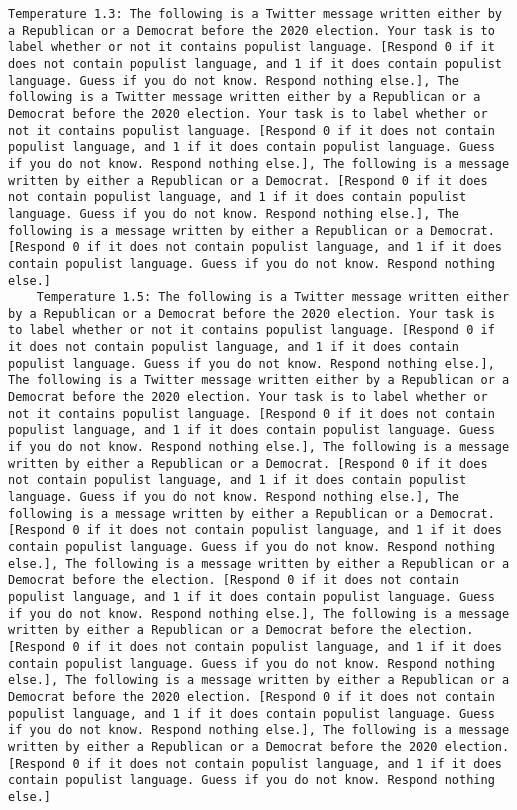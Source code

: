 \begin{lstlisting}[label=lst:poor_performing_prompts]
	Temperature 1.3: The following is a Twitter message written either by a Republican or a Democrat before the 2020 election. Your task is to label whether or not it contains populist language. [Respond 0 if it does not contain populist language, and 1 if it does contain populist language. Guess if you do not know. Respond nothing else.], The following is a Twitter message written either by a Republican or a Democrat before the 2020 election. Your task is to label whether or not it contains populist language. [Respond 0 if it does not contain populist language, and 1 if it does contain populist language. Guess if you do not know. Respond nothing else.], The following is a message written by either a Republican or a Democrat. [Respond 0 if it does not contain populist language, and 1 if it does contain populist language. Guess if you do not know. Respond nothing else.], The following is a message written by either a Republican or a Democrat. [Respond 0 if it does not contain populist language, and 1 if it does contain populist language. Guess if you do not know. Respond nothing else.]
	Temperature 1.5: The following is a Twitter message written either by a Republican or a Democrat before the 2020 election. Your task is to label whether or not it contains populist language. [Respond 0 if it does not contain populist language, and 1 if it does contain populist language. Guess if you do not know. Respond nothing else.], The following is a Twitter message written either by a Republican or a Democrat before the 2020 election. Your task is to label whether or not it contains populist language. [Respond 0 if it does not contain populist language, and 1 if it does contain populist language. Guess if you do not know. Respond nothing else.], The following is a message written by either a Republican or a Democrat. [Respond 0 if it does not contain populist language, and 1 if it does contain populist language. Guess if you do not know. Respond nothing else.], The following is a message written by either a Republican or a Democrat. [Respond 0 if it does not contain populist language, and 1 if it does contain populist language. Guess if you do not know. Respond nothing else.], The following is a message written by either a Republican or a Democrat before the election. [Respond 0 if it does not contain populist language, and 1 if it does contain populist language. Guess if you do not know. Respond nothing else.], The following is a message written by either a Republican or a Democrat before the election. [Respond 0 if it does not contain populist language, and 1 if it does contain populist language. Guess if you do not know. Respond nothing else.], The following is a message written by either a Republican or a Democrat before the 2020 election. [Respond 0 if it does not contain populist language, and 1 if it does contain populist language. Guess if you do not know. Respond nothing else.], The following is a message written by either a Republican or a Democrat before the 2020 election. [Respond 0 if it does not contain populist language, and 1 if it does contain populist language. Guess if you do not know. Respond nothing else.]

\end{lstlisting}
